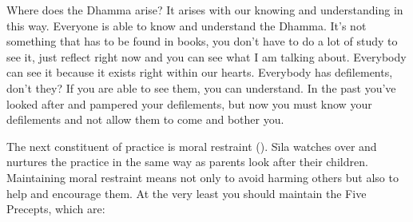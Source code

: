 Where does the Dhamma arise? It arises with our knowing and understanding in this way. Everyone is able to know and understand the Dhamma. It's not something that has to be found in books, you don't have to do a lot of study to see it, just reflect right now and you can see what I am talking about. Everybody can see it because it exists right within our hearts. Everybody has defilements, don't they? If you are able to see them, you can understand. In the past you've looked after and pampered your defilements, but now you must know your defilements and not allow them to come and bother you. 

The next constituent of practice is moral restraint (). S\={\i}la watches over and nurtures the practice in the same way as parents look after their children. Maintaining moral restraint means not only to avoid harming others but also to help and encourage them. At the very least you should maintain the Five Precepts, which are: 

